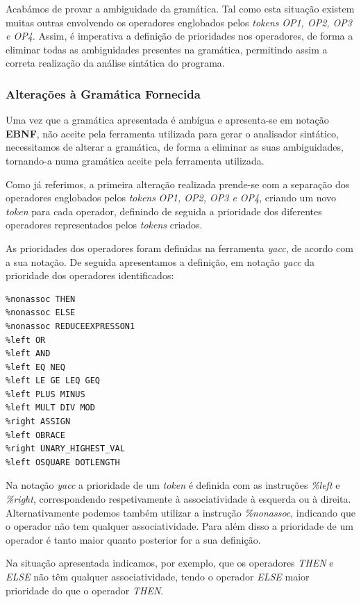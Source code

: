 \documentclass[11pt,a4paper]{article}
\begin{document}
Acabámos de provar a ambiguidade da gramática. Tal como esta situação existem muitas outras envolvendo os operadores englobados pelos \emph{tokens} \emph{OP1, OP2, OP3 e OP4}. Assim, é imperativa a definição de prioridades nos operadores, de forma a eliminar todas as ambiguidades presentes na gramática, permitindo assim a correta realização da análise sintática do programa.

\subsubsection{Alterações à Gramática Fornecida}

Uma vez que a gramática apresentada é ambígua e apresenta-se em notação \textbf{EBNF}, não aceite pela ferramenta utilizada para gerar o analisador sintático, necessitamos de alterar a gramática, de forma a eliminar as suas ambiguidades, tornando-a numa gramática aceite pela ferramenta utilizada.

Como já referimos, a primeira alteração realizada prende-se com a separação dos operadores englobados pelos \emph{tokens} \emph{OP1, OP2, OP3 e OP4}, criando um novo \emph{token} para cada operador, definindo de seguida a prioridade dos diferentes operadores representados pelos \emph{tokens} criados.

As prioridades dos operadores foram definidas na ferramenta \emph{yacc}, de acordo com a sua notação. De seguida apresentamos a definição, em notação \emph{yacc} da prioridade dos operadores identificados:

\begin{lstlisting}
%nonassoc THEN
%nonassoc ELSE
%nonassoc REDUCEEXPRESSON1
%left OR
%left AND
%left EQ NEQ
%left LE GE LEQ GEQ
%left PLUS MINUS
%left MULT DIV MOD
%right ASSIGN
%left OBRACE
%right UNARY_HIGHEST_VAL
%left OSQUARE DOTLENGTH
\end{lstlisting}

\vspace{0.5cm}

Na notação \emph{yacc} a prioridade de um \emph{token} é definida com as instruções \emph{\%left} e \emph{\%right}, correspondendo respetivamente à associatividade à esquerda ou à direita. Alternativamente podemos também utilizar a instrução \emph{\%nonassoc}, indicando que o operador não tem qualquer associatividade. Para além disso a prioridade de um operador é tanto maior quanto posterior for a sua definição.

Na situação apresentada indicamos, por exemplo, que os operadores \emph{THEN} e \emph{ELSE} não têm qualquer associatividade, tendo o operador \emph{ELSE} maior prioridade do que o operador \emph{THEN}.
\end{document}
